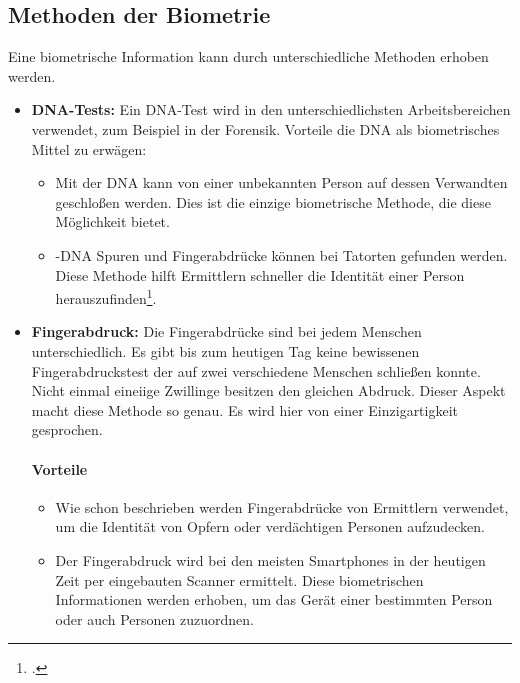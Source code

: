 \subsection{Methoden der Biometrie}
Eine biometrische Information kann durch unterschiedliche Methoden erhoben werden.
\begin{itemize}
	\item \textbf{DNA-Tests:} Ein DNA-Test wird in den unterschiedlichsten Arbeitsbereichen verwendet, zum Beispiel in der Forensik.
	Vorteile die DNA als biometrisches Mittel zu erwägen:
	\begin{itemize}
		\item Mit der DNA kann von einer unbekannten Person auf dessen Verwandten geschloßen werden. Dies ist die einzige biometrische Methode, die diese Möglichkeit bietet.
		\item-DNA Spuren und Fingerabdrücke können bei Tatorten gefunden werden. Diese Methode hilft Ermittlern schneller die Identität einer Person herauszufinden\footcite{dna-test}.
	\end{itemize}
	\item \textbf{Fingerabdruck:} Die Fingerabdrücke sind bei jedem Menschen unterschiedlich. 
	Es gibt bis zum heutigen Tag keine bewissenen Fingerabdruckstest der auf zwei verschiedene Menschen schließen konnte. 
	Nicht einmal eineiige Zwillinge besitzen den gleichen Abdruck.
	Dieser Aspekt macht diese Methode so genau. Es wird hier von einer Einzigartigkeit gesprochen.
	\paragraph{Vorteile}
	\begin{itemize}
		\item Wie schon beschrieben werden Fingerabdrücke von Ermittlern verwendet, um die Identität von Opfern oder verdächtigen Personen aufzudecken.
		\item Der Fingerabdruck wird bei den meisten Smartphones in der heutigen Zeit per eingebauten Scanner ermittelt. Diese biometrischen Informationen werden erhoben, um das Gerät einer bestimmten Person oder auch Personen zuzuordnen.
	\end{itemize}

\end{itemize}
